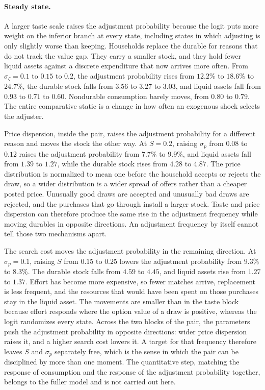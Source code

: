 \paragraph{Steady state.}

A larger taste scale raises the adjustment probability because the logit puts more weight on the inferior branch at every state, including states in which adjusting is only slightly worse than keeping. Households replace the durable for reasons that do not track the value gap. They carry a smaller stock, and they hold fewer liquid assets against a discrete expenditure that now arrives more often. From $\sigma_\zeta = 0.1$ to $0.15$ to $0.2$, the adjustment probability rises from $12.2\%$ to $18.6\%$ to $24.7\%$, the durable stock falls from $3.56$ to $3.27$ to $3.03$, and liquid assets fall from $0.93$ to $0.71$ to $0.60$. Nondurable consumption barely moves, from $0.80$ to $0.79$. The entire comparative static is a change in how often an exogenous shock selects the adjuster.

Price dispersion, inside the pair, raises the adjustment probability for a different reason and moves the stock the other way. At $S = 0.2$, raising $\sigma_p$ from $0.08$ to $0.12$ raises the adjustment probability from $7.7\%$ to $9.9\%$, and liquid assets fall from $1.39$ to $1.27$, while the durable stock rises from $4.28$ to $4.87$. The price distribution is normalized to mean one before the household accepts or rejects the draw, so a wider distribution is a wider spread of offers rather than a cheaper posted price. Unusually good draws are accepted and unusually bad draws are rejected, and the purchases that go through install a larger stock. Taste and price dispersion can therefore produce the same rise in the adjustment frequency while moving durables in opposite directions. An adjustment frequency by itself cannot tell those two mechanisms apart.

The search cost moves the adjustment probability in the remaining direction. At $\sigma_p = 0.1$, raising $S$ from $0.15$ to $0.25$ lowers the adjustment probability from $9.3\%$ to $8.3\%$. The durable stock falls from $4.59$ to $4.45$, and liquid assets rise from $1.27$ to $1.37$. Effort has become more expensive, so fewer matches arrive, replacement is less frequent, and the resources that would have been spent on those purchases stay in the liquid asset. The movements are smaller than in the taste block because effort responds where the option value of a draw is positive, whereas the logit randomizes every state. Across the two blocks of the pair, the parameters push the adjustment probability in opposite directions: wider price dispersion raises it, and a higher search cost lowers it. A target for that frequency therefore leaves $S$ and $\sigma_p$ separately free, which is the sense in which the pair can be disciplined by more than one moment. The quantitative step, matching the response of consumption and the response of the adjustment probability together, belongs to the fuller model and is not carried out here.

